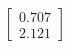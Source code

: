 \documentclass[preview]{standalone}
\begin{document}
\begin{align*}
\begin{bmatrix} 0.707 \\ 2.121 \end{bmatrix}
\end{align*}
\end{document}

